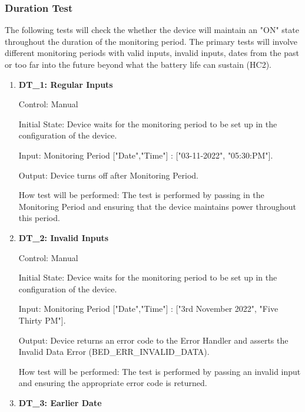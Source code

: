 \documentclass[12pt, titlepage]{article}
\begin{document}
\subsubsection{Duration Test}

The following tests will check the whether the device will maintain an "ON" state throughout the duration of the monitoring period. The primary tests will involve different monitoring periods with valid inputs, invalid inputs, dates from the past or too far into the future beyond what the battery life can sustain (HC2).
		
\begin{enumerate}

	\item{\textbf{DT\_1: Regular Inputs}\\}\label{DT1}
		
		Control: Manual 
							
		Initial State: Device waits for the monitoring period to be set up in the configuration of the device.
							
		Input: Monitoring Period ["Date","Time"]  : ["03-11-2022", "05:30:PM"].
		
		Output: Device turns off after Monitoring Period.
							
		How test will be performed: The test is performed by passing in the Monitoring Period and ensuring that the device maintains power throughout this period.
					
	\item{\textbf{DT\_2: Invalid Inputs}\\}\label{DT2}
	
		Control: Manual 
							
		Initial State: Device waits for the monitoring period to be set up in the configuration of the device.
							
		Input: Monitoring Period ["Date","Time"] : ["3rd November 2022", "Five Thirty PM"].
							
		Output: Device returns an error code to the Error Handler and asserts the Invalid Data Error (BED\_ERR\_INVALID\_DATA).
		
		How test will be performed: The test is performed by passing an invalid input and ensuring the appropriate error code is returned.

	\item{\textbf{DT\_3: Earlier Date}\\}\label{DT3}
		

\end{enumerate}
\end{document}
